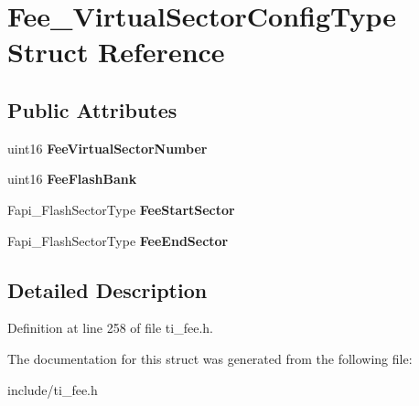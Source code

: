 \hypertarget{structFee__VirtualSectorConfigType}{}\section{Fee\+\_\+\+Virtual\+Sector\+Config\+Type Struct Reference}
\label{structFee__VirtualSectorConfigType}
\subsection*{Public Attributes}
\begin{DoxyCompactItemize}
\item 
\mbox{\label{structFee__VirtualSectorConfigType_a1d6c3a6629226472cc6e65cc0f516d07}} 
uint16 {\bfseries Fee\+Virtual\+Sector\+Number}
\item 
\mbox{\label{structFee__VirtualSectorConfigType_a2c9836f6fe627b0ffa72d61eea0b45cd}} 
uint16 {\bfseries Fee\+Flash\+Bank}
\item 
\mbox{\label{structFee__VirtualSectorConfigType_a17af0dee86dc5f197ab322f800b7e7e7}} 
Fapi\+\_\+\+Flash\+Sector\+Type {\bfseries Fee\+Start\+Sector}
\item 
\mbox{\label{structFee__VirtualSectorConfigType_a4e40aa15b89d8a21f09dffc0a420b5b2}} 
Fapi\+\_\+\+Flash\+Sector\+Type {\bfseries Fee\+End\+Sector}
\end{DoxyCompactItemize}


\subsection{Detailed Description}


Definition at line 258 of file ti\+\_\+fee.\+h.



The documentation for this struct was generated from the following file\+:\begin{DoxyCompactItemize}
\item 
include/ti\+\_\+fee.\+h\end{DoxyCompactItemize}
